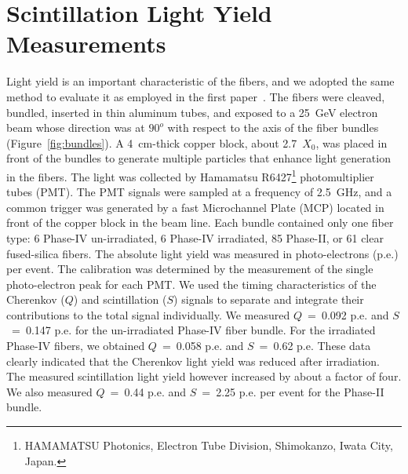\documentclass[a4paper,11pt]{article}
\begin{document}
\section{Scintillation Light Yield Measurements}
\label{sec:lightyield}
Light yield is an important characteristic of the fibers, and we adopted the same method to evaluate it as employed in the first paper~\cite{JINSTPaper}.   The fibers were cleaved, bundled, inserted in thin aluminum tubes, and exposed to a 25~GeV electron beam whose direction was at $90^o$ with respect to the axis of the fiber bundles (Figure~\ref{fig:bundles}). A 4~cm-thick copper block, about 2.7~$X_0$, was placed in front of the bundles to generate multiple particles that enhance light generation in the fibers. The light was collected by Hamamatsu R6427\footnote{HAMAMATSU Photonics, Electron Tube Division, Shimokanzo, Iwata City, Japan.} photomultiplier tubes (PMT). The PMT signals were sampled at a frequency of 2.5~GHz, and a common trigger was generated by a fast Microchannel Plate (MCP) located in front of the copper block in the beam line. Each bundle contained only one fiber type: 6 Phase-IV un-irradiated, 6 Phase-IV irradiated, 85 Phase-II, or 61 clear fused-silica fibers. The absolute light yield was measured in photo-electrons (p.e.) per event. The calibration was determined by the measurement of the single photo-electron peak for each PMT. We used the timing characteristics of the Cherenkov ($Q$) and scintillation ($S$) signals to separate and integrate their contributions to the total signal individually. We measured $Q$~=~0.092 p.e. and $S$~=~0.147 p.e. for the un-irradiated Phase-IV fiber bundle. For the irradiated Phase-IV fibers, we obtained $Q$~=~0.058 p.e. and $S$~=~0.62 p.e.  These data clearly indicated that the Cherenkov light yield was reduced after irradiation. The measured scintillation light yield however increased by about a factor of four. We also measured $Q$~=~0.44 p.e. and $S$~=~2.25 p.e. per event for the Phase-II bundle.
\end{document}
